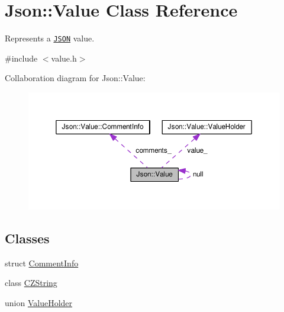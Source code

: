 \hypertarget{classJson_1_1Value}{\section{Json\-:\-:Value Class Reference}
\label{d1/db8/classJson_1_1Value}
}


Represents a \href{http://www.json.org}{\tt J\-S\-O\-N} value.  




{\ttfamily \#include $<$value.\-h$>$}



Collaboration diagram for Json\-:\-:Value\-:
\nopagebreak
\begin{figure}[H]
\begin{center}
\leavevmode
\includegraphics[width=350pt]{d3/dff/classJson_1_1Value__coll__graph}
\end{center}
\end{figure}
\subsection*{Classes}
\begin{DoxyCompactItemize}
\item 
struct \hyperlink{structJson_1_1Value_1_1CommentInfo}{Comment\-Info}
\item 
class \hyperlink{classJson_1_1Value_1_1CZString}{C\-Z\-String}
\item 
union \hyperlink{unionJson_1_1Value_1_1ValueHolder}{Value\-Holder}
\end{DoxyCompactItemize}
